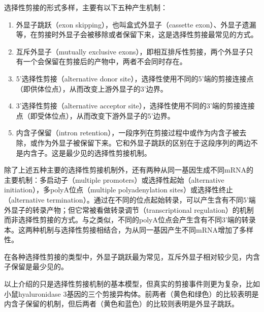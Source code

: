 选择性剪接的形式多样，主要有以下五种产生机制：
\begin{enumerate}
	\item 外显子跳跃（exon skipping），也叫盒式外显子（cassette exon）、外显子遗漏等，在剪接时外显子会被移除或者保留下来，这是选择性剪接最常见的方式。
	\item 互斥外显子（mutually exclusive exons），即相互排斥性剪接，两个外显子只有一个会保留在剪接后的产物中，两者不会同时存在。
	\item 5'选择性剪接（alternative donor site），选择性使用不同的5'端的剪接连接点（即供体位点），从而改变上游外显子的3'边界。
	\item 3'选择性剪接（alternative acceptor site），选择性使用不同的3'端的剪接连接点（即受体位点），从而改变下游外显子的5'边界。
	\item 内含子保留（intron retention），一段序列在剪接过程中或作为内含子被去除，或作为外显子被保留下来。它和外显子跳跃的区别在于这段序列的两边不是内含子。这是最少见的选择性剪接机制。
\end{enumerate}

除了上述五种主要的选择性剪接机制外，还有两种从同一基因生成不同mRNA的主要机制：多启动子（multiple promoters）或选择性起始（alternative initiation），多polyA位点（multiple polyadenylation sites）或选择性终止（alternative termination）。通过在不同的位点起始转录，可以产生含有不同5'端外显子的转录产物；但它常被看做转录调节（transcriptional regulation）的机制而非选择性剪接的方式。与之类似，不同的polyA位点会产生含有不同3'端的转录本。这两种机制与选择性剪接相结合，为从同一基因产生不同mRNA增加了多样性。

在各种选择性剪接的类型中，外显子跳跃最为常见，互斥外显子相对较少见，内含子保留是最少见的。

以上介绍的只是选择性剪接机制的基本模型，但真实的剪接事件则更为复杂，比如小鼠hyaluronidase 3基因的三个剪接异构体。前两者（黄色和绿色）的比较表明是内含子保留的机制，但后两者（黄色和蓝色）的比较则表明是外显子跳跃。

